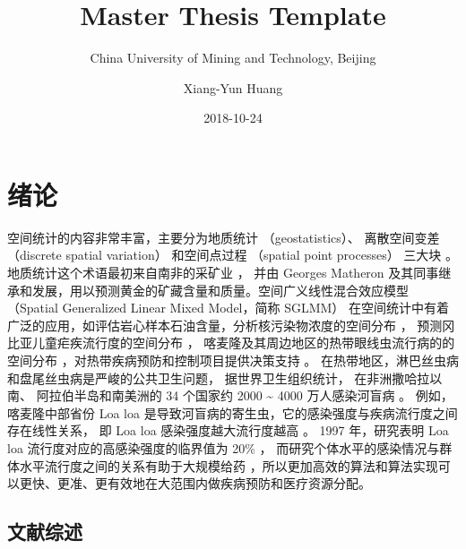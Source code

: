 \documentclass[12pt,a4paper,UTF8,twoside]{book}
\title{Master Thesis Template}
\subtitle{China University of Mining and Technology, Beijing}
\author{Xiang-Yun Huang}
\date{2018-10-24}
\theoremstyle{definition}
\theoremstyle{definition}
\theoremstyle{definition}
\theoremstyle{remark}
\begin{document}





{
\setcounter{tocdepth}{2}
\tableofcontents
}

\mainmatter

\hypertarget{intro}{%
\chapter{绪论}\label{intro}}

空间统计的内容非常丰富，主要分为地质统计 （geostatistics）、
离散空间变差 （discrete spatial variation） 和空间点过程 （spatial point
processes） 三大块 \citep{Cressie1993}。
地质统计这个术语最初来自南非的采矿业 \citep{Krige1951}， 并由 Georges
Matheron
及其同事继承和发展，用以预测黄金的矿藏含量和质量。空间广义线性混合效应模型
（Spatial Generalized Linear Mixed Model，简称 SGLMM）
在空间统计中有着广泛的应用，如评估岩心样本石油含量，分析核污染物浓度的空间分布
\citep{Diggle1998}， 预测冈比亚儿童疟疾流行度的空间分布
\citep{Diggle2002Childhood}，
喀麦隆及其周边地区的热带眼线虫流行病的的空间分布
\citep{Diggle2007ATMP}，对热带疾病预防和控制项目提供决策支持
\citep{Schl2016Using}。
在热带地区，淋巴丝虫病和盘尾丝虫病是严峻的公共卫生问题，
据世界卫生组织统计， 在非洲撒哈拉以南、 阿拉伯半岛和南美洲的 34 个国家约
2000 \textasciitilde{} 4000 万人感染河盲病 \citep{Takougang2002Rapid}。
例如， 喀麦隆中部省份 Loa loa
是导致河盲病的寄生虫，它的感染强度与疾病流行度之间存在线性关系， 即 Loa
loa 感染强度越大流行度越高 \citep{Boussinesq2001}。 1997 年，研究表明
Loa loa 流行度对应的高感染强度的临界值为 20\%
\citep{Gardon1997Serious}，
而研究个体水平的感染情况与群体水平流行度之间的关系有助于大规模给药
\citep{Schl2016Using}，所以更加高效的算法和算法实现可以更快、更准、更有效地在大范围内做疾病预防和医疗资源分配。

\hypertarget{reviews}{%
\section{文献综述}\label{reviews}}
\end{document}
